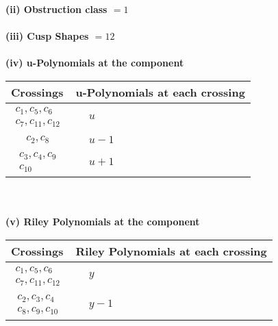 \documentclass[1p]{elsarticle_modified}
\theoremstyle{definition}
\begin{document}
\flushleft \textbf{(ii) Obstruction class $= 1$}\\~\\
\flushleft \textbf{(iii) Cusp Shapes $= 12$}\\~\\
\newpage\renewcommand{\arraystretch}{1}
\flushleft \textbf{(iv) u-Polynomials at the component}\newline \\
\begin{tabular}{m{50pt}|m{274pt}}
Crossings & \hspace{64pt}u-Polynomials at each crossing \\
\hline $$\begin{aligned}c_{1},c_{5},c_{6}\\c_{7},c_{11},c_{12}\end{aligned}$$&$\begin{aligned}
&u
\end{aligned}$\\
\hline $$\begin{aligned}c_{2},c_{8}\end{aligned}$$&$\begin{aligned}
&u-1
\end{aligned}$\\
\hline $$\begin{aligned}c_{3},c_{4},c_{9}\\c_{10}\end{aligned}$$&$\begin{aligned}
&u+1
\end{aligned}$\\
\hline
\end{tabular}\\~\\
\newpage\renewcommand{\arraystretch}{1}
\flushleft \textbf{(v) Riley Polynomials at the component}\newline \\
\begin{tabular}{m{50pt}|m{274pt}}
Crossings & \hspace{64pt}Riley Polynomials at each crossing \\
\hline $$\begin{aligned}c_{1},c_{5},c_{6}\\c_{7},c_{11},c_{12}\end{aligned}$$&$\begin{aligned}
&y
\end{aligned}$\\
\hline $$\begin{aligned}c_{2},c_{3},c_{4}\\c_{8},c_{9},c_{10}\end{aligned}$$&$\begin{aligned}
&y-1
\end{aligned}$\\
\hline
\end{tabular}\\~\\
\end{document}
